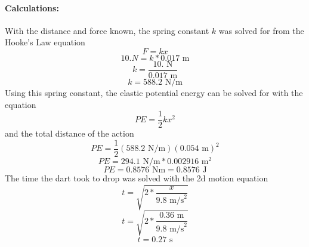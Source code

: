 \documentclass[12pt]{article}
\begin{document}
	\paragraph{Calculations:}
	With the distance and force known, the spring constant $k$ was solved for from the Hooke's Law equation
		\begin{equation}
			F = kx
		\end{equation}
		$$ 10. N = k * 0.017 \text{ m} $$
		$$ k = \frac{10. \text{ N}}{0.017 \text{ m}} $$
		$$ k = 588.2 \text{ N/m} $$
		Using this spring constant, the elastic potential energy can be solved for with the equation
		\begin{equation}
			PE = \frac{1}{2}kx^2
		\end{equation}
		and the total distance of the action
		$$ PE = \frac{1}{2}(588.2\text{ N/m})(0.054\text{ m})^2 $$
		$$ PE = 294.1\text{ N/m} * 0.002916\text{ m}^2 $$
		$$ PE = 0.8576\text{ Nm} = 0.8576\text{ J} $$
		The time the dart took to drop was solved with the 2d motion equation
		\begin{equation}
			t = \sqrt{2 * \frac{x}{9.8\text{ m/s}^2}}
		\end{equation}
		$$ t = \sqrt{2 * \frac{0.36\text{ m}}{9.8\text{ m/s}^2}} $$
		$$ t =  0.27\text{ s} $$
	
\end{document}
